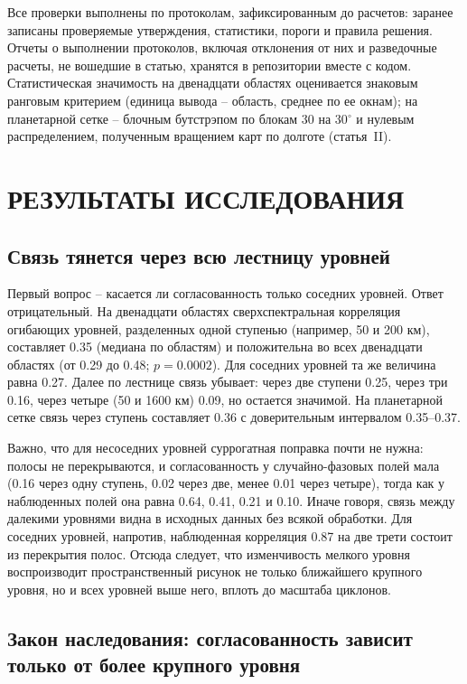 \documentclass[12pt,a4paper]{article}
\begin{document}
Все проверки выполнены по протоколам, зафиксированным до расчетов: заранее записаны проверяемые утверждения, статистики, пороги и правила решения. Отчеты о выполнении протоколов, включая отклонения от них и разведочные расчеты, не вошедшие в статью, хранятся в репозитории вместе с кодом. Статистическая значимость на двенадцати областях оценивается знаковым ранговым критерием (единица вывода -- область, среднее по ее окнам); на планетарной сетке -- блочным бутстрэпом по блокам 30 на 30$^\circ$ и нулевым распределением, полученным вращением карт по долготе (статья~II).

\section{РЕЗУЛЬТАТЫ ИССЛЕДОВАНИЯ}

\subsection{Связь тянется через всю лестницу уровней}

Первый вопрос -- касается ли согласованность только соседних уровней. Ответ отрицательный. На двенадцати областях сверхспектральная корреляция огибающих уровней, разделенных одной ступенью (например, 50 и 200 км), составляет 0.35 (медиана по областям) и положительна во всех двенадцати областях (от 0.29 до 0.48; $p = 0.0002$). Для соседних уровней та же величина равна 0.27. Далее по лестнице связь убывает: через две ступени 0.25, через три 0.16, через четыре (50 и 1600 км) 0.09, но остается значимой. На планетарной сетке связь через ступень составляет 0.36 с доверительным интервалом 0.35--0.37.

Важно, что для несоседних уровней суррогатная поправка почти не нужна: полосы не перекрываются, и согласованность у случайно-фазовых полей мала (0.16 через одну ступень, 0.02 через две, менее 0.01 через четыре), тогда как у наблюденных полей она равна 0.64, 0.41, 0.21 и 0.10. Иначе говоря, связь между далекими уровнями видна в исходных данных без всякой обработки. Для соседних уровней, напротив, наблюденная корреляция 0.87 на две трети состоит из перекрытия полос. Отсюда следует, что изменчивость мелкого уровня воспроизводит пространственный рисунок не только ближайшего крупного уровня, но и всех уровней выше него, вплоть до масштаба циклонов.

\subsection{Закон наследования: согласованность зависит только от более крупного уровня}
\end{document}
